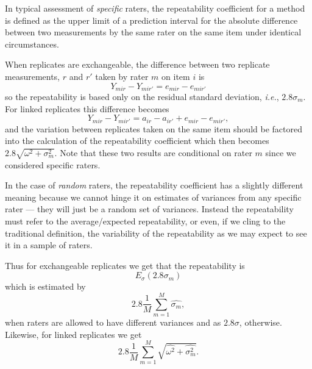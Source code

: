 \documentclass[aoas]{imsart}
\makeatletter
\newcommand{\ie}{\emph{i.e.}\@\xspace}
\makeatother
\begin{document}
In typical assessment of \emph{specific} raters, the repeatability
coefficient for a method is defined as the upper limit of a prediction
interval for the absolute difference between two measurements by the
same rater on the same item under identical circumstances. 

When replicates are exchangeable, the difference between two replicate
measurements, $r$ and $r'$ taken by rater $m$ on item $i$ is
\begin{equation}
 Y_{mir} - Y_{mir'} = e_{mir}- e_{mir'}
\end{equation}
so the repeatability is based only on the residual standard deviation,
\ie, $2.8\sigma_m$. For linked replicates this difference becomes
\begin{equation}
 Y_{mir} - Y_{mir'} = a_{ir}- a_{ir'}  + e_{mir}- e_{mir'}, \label{eq:linked-repeat}
\end{equation}
and the variation between replicates taken on the same item should be
factored into the calculation of the repeatability coefficient which
then becomes $2.8\sqrt{\omega^2 +\sigma_m^2}$. Note that these two
results are conditional on rater $m$ since we considered specific raters.


In the case of \emph{random} raters, the repeatability coefficient has a
slightly different meaning because we cannot hinge it on estimates of
variances from any specific rater --- they will just be a random set
of variances. Instead the repeatability must refer to the
average/expected repeatability, or even, if we cling to the traditional
definition, the variability of the repeatability as we may expect to
see it in a sample of raters.

Thus for exchangeable replicates we get that the repeatability is 
$$ %
    E_\sigma(2.8\sigma_m)    
$$ %
which is estimated by
\begin{equation}
    2.8\frac{1}{M}\sum_{m=1}^M\widehat{\sigma_m}, \label{repeatability-coefficient}
\end{equation}
when raters are allowed to have different variances and as $2.8
\sigma$, otherwise.  Likewise, for linked replicates we get
\begin{equation}
    2.8\frac{1}{M}\sum_{m=1}^M\sqrt{\widehat{\omega^2} + \widehat{\sigma_m^2}}.
\end{equation}



\end{document}
